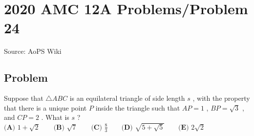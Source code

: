\documentclass[12pt]{article}
\begin{document}
\section*{{2020 AMC 12A Problems/Problem 24}}
Source: AoPS Wiki

\subsection*{Problem}
Suppose that $\triangle{ABC}$ is an equilateral triangle of side length $s$ , with the property that there is a unique point $P$ inside the triangle such that $AP=1$ , $BP=\sqrt{3}$ , and $CP=2$ . What is $s$ ? $\textbf{(A) } 1+\sqrt{2} \qquad \textbf{(B) } \sqrt{7} \qquad \textbf{(C) } \frac{8}{3} \qquad \textbf{(D) } \sqrt{5+\sqrt{5}} \qquad \textbf{(E) } 2\sqrt{2}$
\end{document}
